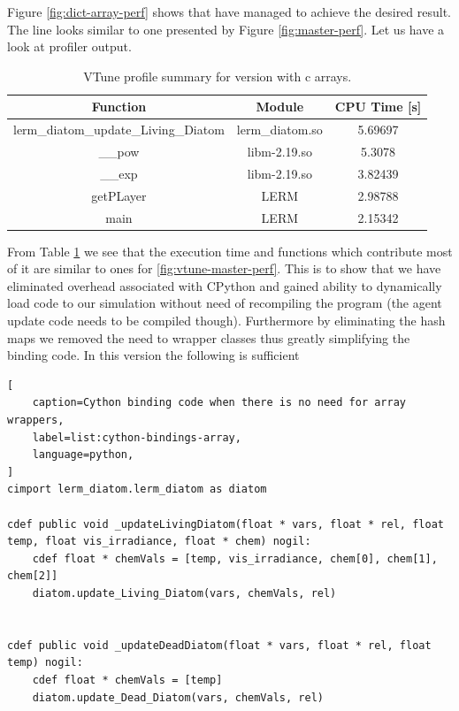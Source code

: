 \documentclass[12pt, a4paper]{report}
\begin{document}
Figure \ref{fig:dict-array-perf} shows that have managed to achieve the desired result.
The line looks similar to one presented by Figure \ref{fig:master-perf}. Let us have
a look at profiler output.

\begin{table}
  \begin{center}
    \begin{tabular}{|c|c||c|}
    \hline
    Function                             & Module          & CPU Time [s] \\ \hline
    lerm\_diatom\_update\_Living\_Diatom & lerm\_diatom.so & 5.69697      \\
    \_\_pow                              & libm-2.19.so    & 5.3078       \\
    \_\_exp                              & libm-2.19.so    & 3.82439      \\
    getPLayer                            & LERM            & 2.98788      \\
    main                                 & LERM            & 2.15342      \\ \hline
    \end{tabular}
    \caption {VTune profile summary for version with c arrays.}
    \label{table:vtune-dict-array-profile}
  \end{center}
\end{table}

From Table \ref{table:vtune-dict-array-profile} we see that the execution time and
functions which contribute most of it are similar to ones for \ref{fig:vtune-master-perf}.
This is to show that we have eliminated overhead associated with CPython and gained
ability to dynamically load code to our simulation without need of recompiling the program
(the agent update code needs to be compiled though). Furthermore by eliminating the hash
maps we removed the need to wrapper classes thus greatly simplifying the binding code. In
this version the following is sufficient

\begin{lstlisting}[
    caption=Cython binding code when there is no need for array wrappers,
    label=list:cython-bindings-array,
    language=python,
]
cimport lerm_diatom.lerm_diatom as diatom

cdef public void _updateLivingDiatom(float * vars, float * rel, float temp, float vis_irradiance, float * chem) nogil:
    cdef float * chemVals = [temp, vis_irradiance, chem[0], chem[1], chem[2]]
    diatom.update_Living_Diatom(vars, chemVals, rel)


cdef public void _updateDeadDiatom(float * vars, float * rel, float temp) nogil:
    cdef float * chemVals = [temp]
    diatom.update_Dead_Diatom(vars, chemVals, rel)
\end{lstlisting}
\end{document}
